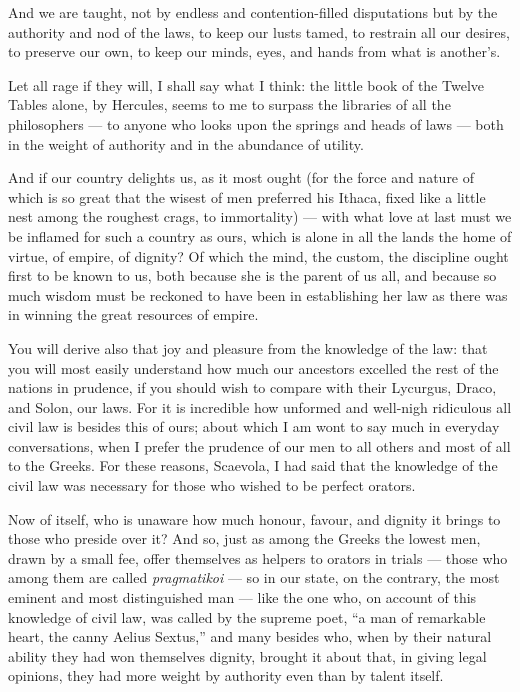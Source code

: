  And we are taught, not by endless and contention-filled disputations but by the authority and nod of the laws, to keep our lusts tamed, to restrain all our desires, to preserve our own, to keep our minds, eyes, and hands from what is another's.

 Let all rage if they will, I shall say what I think: the little book of the Twelve Tables alone, by Hercules, seems to me to surpass the libraries of all the philosophers — to anyone who looks upon the springs and heads of laws — both in the weight of authority and in the abundance of utility.

 And if our country delights us, as it most ought (for the force and nature of which is so great that the wisest of men preferred his Ithaca, fixed like a little nest among the roughest crags, to immortality) — with what love at last must we be inflamed for such a country as ours, which is alone in all the lands the home of virtue, of empire, of dignity? Of which the mind, the custom, the discipline ought first to be known to us, both because she is the parent of us all, and because so much wisdom must be reckoned to have been in establishing her law as there was in winning the great resources of empire.

 You will derive also that joy and pleasure from the knowledge of the law: that you will most easily understand how much our ancestors excelled the rest of the nations in prudence, if you should wish to compare with their Lycurgus, Draco, and Solon, our laws. For it is incredible how unformed and well-nigh ridiculous all civil law is besides this of ours; about which I am wont to say much in everyday conversations, when I prefer the prudence of our men to all others and most of all to the Greeks. For these reasons, Scaevola, I had said that the knowledge of the civil law was necessary for those who wished to be perfect orators.

 Now of itself, who is unaware how much honour, favour, and dignity it brings to those who preside over it? And so, just as among the Greeks the lowest men, drawn by a small fee, offer themselves as helpers to orators in trials — those who among them are called \textit{pragmatikoi} — so in our state, on the contrary, the most eminent and most distinguished man — like the one who, on account of this knowledge of civil law, was called by the supreme poet, ``a man of remarkable heart, the canny Aelius Sextus,'' and many besides who, when by their natural ability they had won themselves dignity, brought it about that, in giving legal opinions, they had more weight by authority even than by talent itself.

